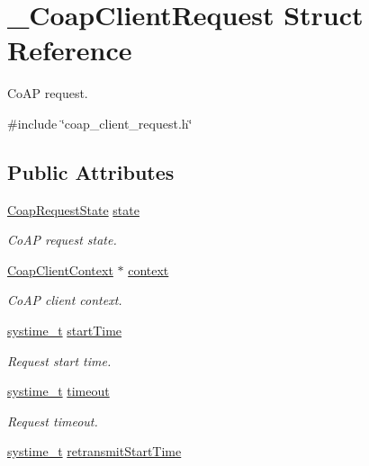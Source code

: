 \hypertarget{struct__CoapClientRequest}{}\section{\+\_\+\+Coap\+Client\+Request Struct Reference}
\label{struct__CoapClientRequest}


Co\+AP request.  




{\ttfamily \#include \char`\"{}coap\+\_\+client\+\_\+request.\+h\char`\"{}}

\subsection*{Public Attributes}
\begin{DoxyCompactItemize}
\item 
\hyperlink{coap__client__request_8h_ae23250f18b3b2a3d2dc7dc98cc664d04}{Coap\+Request\+State} \hyperlink{struct__CoapClientRequest_a9752aca06b0b4278196a77db2697eb56}{state}
\begin{DoxyCompactList}\small\item\em Co\+AP request state. \end{DoxyCompactList}\item 
\hyperlink{coap__client_8h_a3b7ac08b734045846f1dba69cd6b8700}{Coap\+Client\+Context} $\ast$ \hyperlink{struct__CoapClientRequest_aadceccf87b412f53a9e4549c3a3fec5c}{context}
\begin{DoxyCompactList}\small\item\em Co\+AP client context. \end{DoxyCompactList}\item 
\hyperlink{compiler__port_8h_ae3e32a98d431a02106616da3071832dd}{systime\+\_\+t} \hyperlink{struct__CoapClientRequest_a183ffb53f21e7acfe53c166e43540c50}{start\+Time}
\begin{DoxyCompactList}\small\item\em Request start time. \end{DoxyCompactList}\item 
\hyperlink{compiler__port_8h_ae3e32a98d431a02106616da3071832dd}{systime\+\_\+t} \hyperlink{struct__CoapClientRequest_a00fe6c1d2447ea2493087a18a44895a7}{timeout}
\begin{DoxyCompactList}\small\item\em Request timeout. \end{DoxyCompactList}\item 
\hyperlink{compiler__port_8h_ae3e32a98d431a02106616da3071832dd}{systime\+\_\+t} \hyperlink{struct__CoapClientRequest_a03c1caaa6b21103fb89c392c80c5b086}{retransmit\+Start\+Time}

\end{DoxyCompactItemize}
